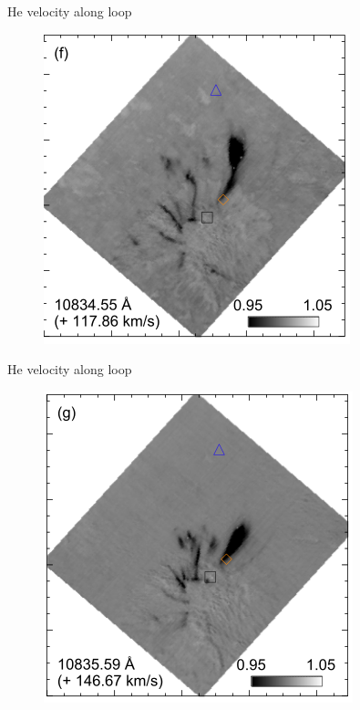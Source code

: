 \documentclass{beamer}
\begin{document}
\begin{frame}{He velocity along loop}
 
\begin{figure}[H]
 \centering
 \includegraphics[scale=0.6]{spf.png}
\end{figure}

\end{frame}
\begin{frame}{He velocity along loop}
 
\begin{figure}[H]
 \centering
 \includegraphics[scale=0.6]{spg.png}
\end{figure}

\end{frame}
\end{document}
